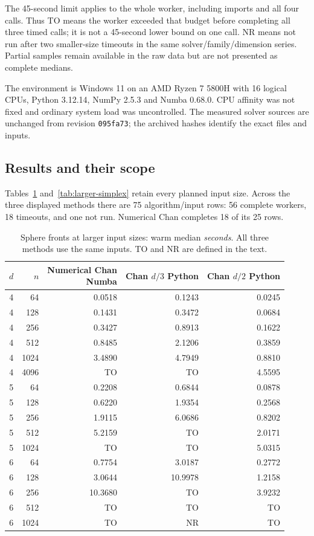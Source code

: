 The 45-second limit applies to the whole worker, including imports and
all four calls. Thus TO means the worker exceeded that budget before completing all
three timed calls; it is not a 45-second lower bound on one call. NR means not run after two smaller-size timeouts in the same
solver/family/dimension series. Partial samples remain available in the
raw data but are not presented as complete medians.

The environment is Windows 11 on an AMD Ryzen 7 5800H with 16 logical
CPUs, Python 3.12.14, NumPy 2.5.3 and Numba 0.68.0. CPU affinity was not
fixed and ordinary system load was uncontrolled. The measured solver
sources are unchanged from revision \texttt{095fa73}; the archived hashes
identify the exact files and inputs.

\subsection{Results and their scope}
Tables~\ref{tab:larger-sphere} and~\ref{tab:larger-simplex} retain every
planned input size. Across the three displayed methods there are 75
algorithm/input rows: 56 complete workers, 18 timeouts, and one not run.
Numerical Chan completes 18 of its 25 rows.

\begin{table}[p]
\centering\small
\setlength{\tabcolsep}{5pt}
\begin{tabular}{rrrrr}
\toprule
$d$ & $n$ & \shortstack{Numerical Chan\\Numba} & \shortstack{Chan $d/3$\\Python} & \shortstack{Chan $d/2$\\Python} \\
\midrule
4 & 64 & 0.0518 & 0.1243 & 0.0245 \\
4 & 128 & 0.1431 & 0.3472 & 0.0684 \\
4 & 256 & 0.3427 & 0.8913 & 0.1622 \\
4 & 512 & 0.8485 & 2.1206 & 0.3859 \\
4 & 1024 & 3.4890 & 4.7949 & 0.8810 \\
4 & 4096 & TO & TO & 4.5595 \\
5 & 64 & 0.2208 & 0.6844 & 0.0878 \\
5 & 128 & 0.6220 & 1.9354 & 0.2568 \\
5 & 256 & 1.9115 & 6.0686 & 0.8202 \\
5 & 512 & 5.2159 & TO & 2.0171 \\
5 & 1024 & TO & TO & 5.0315 \\
6 & 64 & 0.7754 & 3.0187 & 0.2772 \\
6 & 128 & 3.0644 & 10.9978 & 1.2158 \\
6 & 256 & 10.3680 & TO & 3.9232 \\
6 & 512 & TO & TO & TO \\
6 & 1024 & TO & NR & TO \\
\bottomrule
\end{tabular}
\caption{Sphere fronts at larger input sizes: warm median \emph{seconds}. All three methods use the same inputs. TO and NR are defined in the text.}
\label{tab:larger-sphere}
\end{table}

